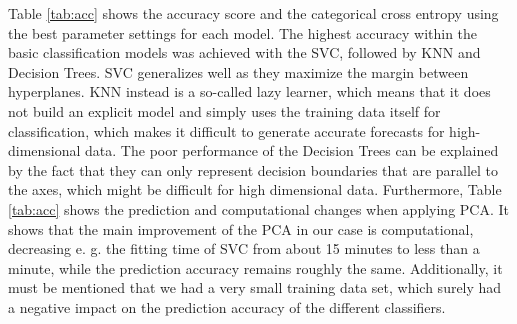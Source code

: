 \documentclass[11pt,titlepage,oneside,openany]{article}
\begin{document}
Table \ref{tab:acc} shows the accuracy score and the categorical cross entropy  using the best parameter settings for each model.
The highest accuracy within the basic classification models was achieved with the SVC, followed by KNN and Decision Trees. SVC generalizes well as they maximize the margin between hyperplanes. KNN instead is a so-called lazy learner, which means that it does not build an explicit model and simply uses the training data itself for classification, which makes it difficult to generate accurate forecasts for high-dimensional data. The poor performance of the Decision Trees can be explained by the fact that they can only represent decision boundaries that are parallel to the axes, which might be difficult for high dimensional data.
Furthermore, Table \ref{tab:acc} shows the prediction and computational changes when applying PCA. It shows that the main improvement of the PCA in our case is computational, decreasing e. g. the fitting time of SVC from about 15 minutes to less than a minute, while the prediction accuracy remains roughly the same.
Additionally, it must be mentioned that we had a very small training data set, which surely had a negative impact on the prediction accuracy of the different classifiers. 
\end{document}
